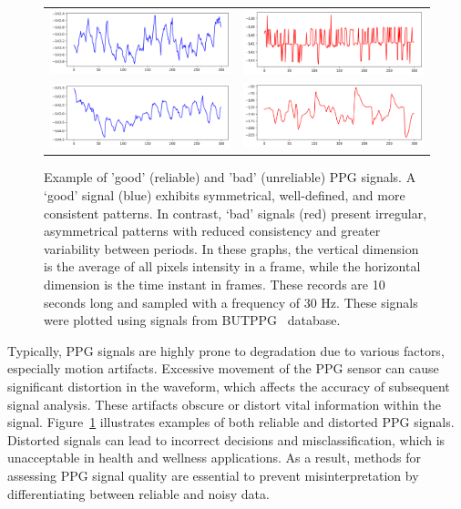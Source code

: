 \begin{figure}
    \begin{tabular}{cc}
        \includegraphics[width=0.48\linewidth]{img/samples/butppg_111001.png} 
        & \includegraphics[width=0.48\linewidth]{img/samples/butppg_111003.png} \\
        \includegraphics[width=0.48\linewidth]{img/samples/butppg_111002.png} 
        & \includegraphics[width=0.48\linewidth]{img/samples/butppg_111004.png} \\
    \end{tabular}
    \caption{Example of 'good' (reliable) and 'bad' (unreliable) PPG signals. A `good' signal (blue) exhibits symmetrical, well-defined, and more consistent patterns. In contrast, `bad' signals (red) present irregular, asymmetrical patterns with reduced consistency and greater variability between periods. In these graphs, the vertical dimension is the average of all pixels intensity in a frame, while the horizontal dimension is the time instant in frames. These records are 10 seconds long and sampled with a frequency of 30 Hz. These signals were plotted using signals from BUTPPG~\protect\cite{butppg} database.}
    \label{fig:butppg_samples}
\end{figure}

Typically, \gls{PPG} signals are highly prone to degradation due to various factors, especially motion artifacts. Excessive movement of the \gls{PPG} sensor can cause significant distortion in the waveform, which affects the accuracy of subsequent signal analysis. These artifacts obscure or distort vital information within the signal. Figure~\ref{fig:butppg_samples} illustrates examples of both reliable and distorted \gls{PPG} signals. Distorted signals can lead to incorrect decisions and misclassification, which is unacceptable in health and wellness applications. As a result, methods for assessing \gls{PPG} signal quality are essential to prevent misinterpretation by differentiating between reliable and noisy data.

